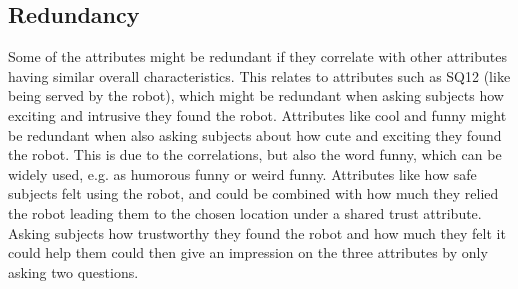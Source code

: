 \subsection{Redundancy}
%
Some of the attributes might be redundant if they correlate with other attributes having similar overall characteristics. This relates to attributes such as SQ12 (like being served by the robot), which might be redundant when asking subjects how exciting and intrusive they found the robot. Attributes like cool and funny might be redundant when also asking subjects about how cute and exciting they found the robot. This is due to the correlations, but also the word funny, which can be widely used, e.g. as humorous funny or weird funny. Attributes like how safe subjects felt using the robot, and could be combined with how much they relied the robot leading them to the chosen location under a shared trust attribute. Asking subjects how trustworthy they found the robot and how much they felt it could help them could then give an impression on the three attributes by only asking two questions.